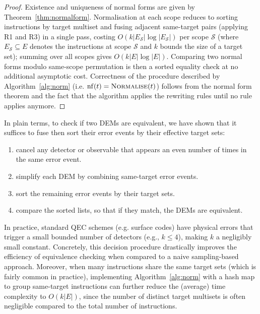 \documentclass[11pt,a4paper]{article}
\newcommand{\nf}[1]{\mathrm{nf}(#1)}  %
\begin{document}
\begin{proof}
Existence and uniqueness of normal forms are given by Theorem~\ref{thm:normalform}. Normalisation at each scope reduces to sorting instructions by target multiset and fusing adjacent same-target pairs (applying R1 and R3) in a single pass, costing $O(k|E_{\mathcal{S}}|\log|E_{\mathcal{S}}|)$ per scope $\mathcal{S}$ (where $E_{\mathcal{S}} \subseteq E$ denotes the instructions at scope $\mathcal{S}$ and $k$ bounds the size of a target set); summing over all scopes gives $O(k|E|\log|E|)$. Comparing two normal forms modulo same-scope permutation is then a sorted equality check at no additional asymptotic cost. Correctness of the procedure described by Algorithm~\ref{alg:norm} (i.e. $\nf{t} = \textsc{Normalise}(t)$) follows from the normal form theorem and the fact that the algorithm applies the rewriting rules until no rule applies anymore.
\end{proof}

In plain terms, to check if two DEMs are equivalent, we have shown that it suffices to fuse then sort their error events by their effective target sets:

\begin{enumerate}
  \item cancel any detector or observable that appears an even number of times in the same error event.
  \item simplify each DEM by combining same-target error events.
  \item sort the remaining error events by their target sets.
  \item compare the sorted lists, so that if they match, the DEMs are equivalent.
\end{enumerate}

In practice, standard QEC schemes (e.g. surface codes) have physical errors that trigger a small bounded number of detectors (e.g., $k \le 4$), making $k$ a negligibly small constant. Concretely, this decision procedure drastically improves the efficiency of equivalence checking when compared to a naive sampling-based approach.
Moreover, when many instructions share the same target sets (which is fairly common in practice), implementing Algorithm~\ref{alg:norm} with a hash map to group same-target instructions can further reduce the (average) time complexity to $O(k|E|)$, since the number of distinct target multisets is often negligible compared to the total number of instructions.
\end{document}
